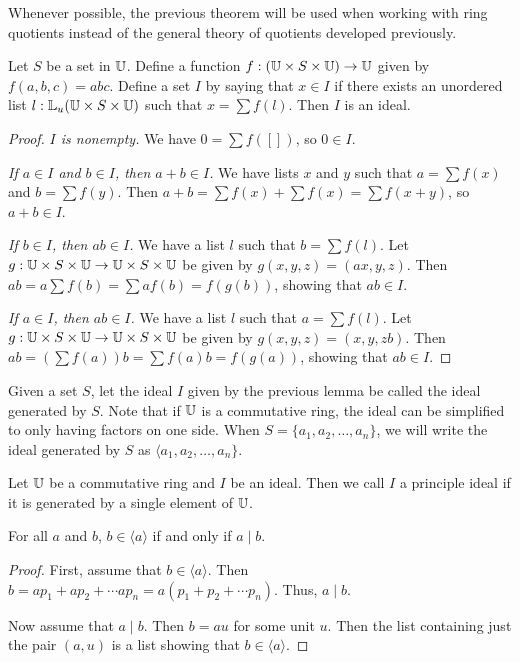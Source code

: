 \documentclass[../../math.tex]{subfiles}
\begin{document}
Whenever possible, the previous theorem will be used when working with ring
quotients instead of the general theory of quotients developed previously.

\begin{lemma}
    Let $S$ be a set in $\mathbb{U}$.  Define a function $f : (\mathbb{U} \times S \times \mathbb{U})
    \to \mathbb{U}$ given by $f(a, b, c) = abc$.  Define a set $I$ by saying that $x \in
    I$ if there exists an unordered list $l : \mathbb{L}_u(\mathbb{U} \times S \times \mathbb{U})$ such
    that $x = \sum f(l)$.  Then $I$ is an ideal.
\end{lemma}
\begin{proof}
    \textit{$I$ is nonempty.} We have $0 = \sum f([])$, so $0 \in I$.

    \textit{If $a \in I$ and $b \in I$, then $a + b \in I$.}  We have lists $x$
    and $y$ such that $a = \sum f(x)$ and $b = \sum f(y)$.  Then $a + b = \sum
    f(x) + \sum f(x) = \sum f(x + y)$, so $a + b \in I$.

    \textit{If $b \in I$, then $ab \in I$.}  We have a list $l$ such that $b =
    \sum f(l)$.  Let $g : \mathbb{U} \times S \times \mathbb{U} \to \mathbb{U} \times S \times \mathbb{U}$ be
    given by $g(x, y, z) = (ax, y, z)$.  Then $ab = a\sum f(b) = \sum af(b) =
    f(g(b))$, showing that $ab \in I$.

    \textit{If $a \in I$, then $ab \in I$.}  We have a list $l$ such that $a =
    \sum f(l)$.  Let $g : \mathbb{U} \times S \times \mathbb{U} \to \mathbb{U} \times S \times \mathbb{U}$ be
    given by $g(x, y, z) = (x, y, zb)$.  Then $ab = \left( \sum f(a) \right) b =
    \sum f(a)b = f(g(a))$, showing that $ab \in I$.
\end{proof}

\begin{definition}
    Given a set $S$, let the ideal $I$ given by the previous lemma be called the
    ideal generated by $S$.  Note that if $\mathbb{U}$ is a commutative ring, the ideal
    can be simplified to only having factors on one side.  When $S = \{a_1, a_2,
    \ldots, a_n\}$, we will write the ideal generated by $S$ as $\langle a_1,
    a_2, \ldots, a_n\}$.
\end{definition}

\begin{definition}
    Let $\mathbb{U}$ be a commutative ring and $I$ be an ideal.  Then we call $I$ a
    principle ideal if it is generated by a single element of $\mathbb{U}$.
\end{definition}

\begin{theorem} \label{principle_ideal_div} \label{cideal_generated_by_single}
    For all $a$ and $b$, $b \in \langle a \rangle$ if and only if $a \mid b$.
\end{theorem}
\begin{proof}
    First, assume that $b \in \langle a \rangle$.  Then $b = ap_1 + ap_2 +
    \cdots ap_n = a(p_1 + p_2 + \cdots p_n)$.  Thus, $a \mid b$.

    Now assume that $a \mid b$.  Then $b = au$ for some unit $u$.  Then the list
    containing just the pair $(a, u)$ is a list showing that $b \in \langle a
    \rangle$.
\end{proof}
\end{document}
